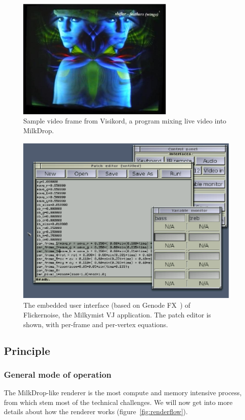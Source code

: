 \documentclass[a4paper,11pt]{kthesis}
\begin{document}
\begin{figure}[htp]
\centering
\includegraphics[height=60mm]{visikord.eps}
\caption{Sample video frame from Visikord, a program mixing live video into MilkDrop.}
\label{fig:visikord}
\end{figure}

\begin{figure}[htp]
\centering
\includegraphics[height=85mm]{flickernoise.eps}
\caption{The embedded user interface (based on Genode FX~\cite{genodefx}) of Flickernoise, the Milkymist VJ application. The patch editor is shown, with per-frame and per-vertex equations.}
\label{fig:flickernoise}
\end{figure}

\subsection{Principle}
\label{subsec:mdprinciple}
\subsubsection{General mode of operation}
The MilkDrop-like renderer is the most compute and memory intensive process, from which stem most of the technical challenges. We will now get into more details about how the renderer works (figure~\ref{fig:renderflow}).
\end{document}
